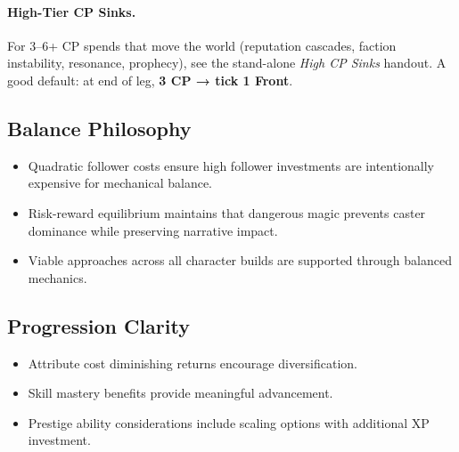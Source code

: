 \documentclass[11pt]{article}
\begin{document}
\paragraph{High-Tier CP Sinks.}
For 3–6+ CP spends that move the world (reputation cascades, faction instability, resonance, prophecy), see the stand-alone \emph{High CP Sinks} handout. A good default: at end of leg, \textbf{3 CP → tick 1 Front}.

\subsection{Balance Philosophy}
\begin{itemize}
    \item Quadratic follower costs ensure high follower investments are intentionally expensive for mechanical balance.
    \item Risk-reward equilibrium maintains that dangerous magic prevents caster dominance while preserving narrative impact.
    \item Viable approaches across all character builds are supported through balanced mechanics.
\end{itemize}

\subsection{Progression Clarity}
\begin{itemize}
    \item Attribute cost diminishing returns encourage diversification.
    \item Skill mastery benefits provide meaningful advancement.
    \item Prestige ability considerations include scaling options with additional XP investment.
\end{itemize}
\end{document}
